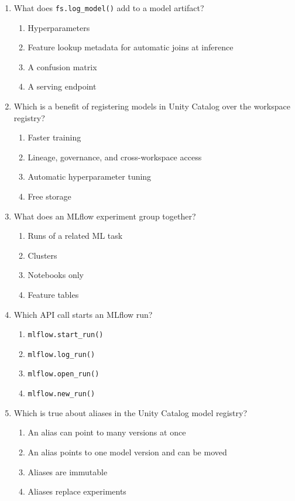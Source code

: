 \documentclass[11pt]{article}
\begin{document}
\begin{enumerate}[leftmargin=*, label=\textbf{Q\arabic*.}]
		\item What does \texttt{fs.log\_model()} add to a model artifact?
		\begin{enumerate}[label=(\alph*)]
			\item Hyperparameters
			\item Feature lookup metadata for automatic joins at inference
			\item A confusion matrix
			\item A serving endpoint
		\end{enumerate}
		
		\item Which is a benefit of registering models in Unity Catalog over the workspace registry?
		\begin{enumerate}[label=(\alph*)]
			\item Faster training
			\item Lineage, governance, and cross-workspace access
			\item Automatic hyperparameter tuning
			\item Free storage
		\end{enumerate}
		
		\item What does an MLflow experiment group together?
		\begin{enumerate}[label=(\alph*)]
			\item Runs of a related ML task
			\item Clusters
			\item Notebooks only
			\item Feature tables
		\end{enumerate}
		
		\item Which API call starts an MLflow run?
		\begin{enumerate}[label=(\alph*)]
			\item \texttt{mlflow.start\_run()}
			\item \texttt{mlflow.log\_run()}
			\item \texttt{mlflow.open\_run()}
			\item \texttt{mlflow.new\_run()}
		\end{enumerate}
		
		\item Which is true about aliases in the Unity Catalog model registry?
		\begin{enumerate}[label=(\alph*)]
			\item An alias can point to many versions at once
			\item An alias points to one model version and can be moved
			\item Aliases are immutable
			\item Aliases replace experiments
		\end{enumerate}
		

\end{enumerate}
\end{document}

